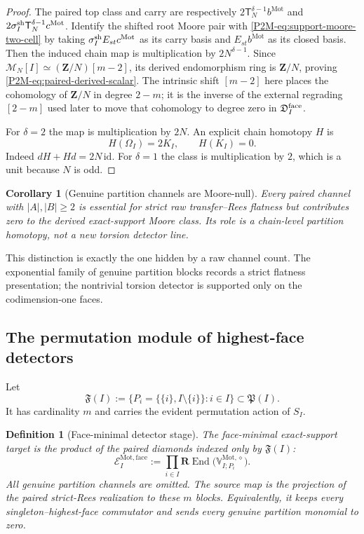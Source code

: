 \documentclass[11pt]{article}
\newtheorem{corollary}[theorem]{Corollary}
\newtheorem{definition}[theorem]{Definition}
\theoremstyle{remark}
\newcommand{\Z}{\mathbf Z}
\newcommand{\REnd}{\mathbf R\!\operatorname{End}}
\newcommand{\Mot}{\mathrm{Mot}}
\begin{document}
\begin{proof}
The paired top class and carry are respectively
$2\mathsf T_N^{\delta-1}b^{\Mot}$ and
$2\sigma_I^{\rm sh}\mathsf T_N^{\delta-1}c^{\Mot}$.  Identify the shifted
root Moore pair with \eqref{P2M-eq:support-moore-two-cell} by taking
$\sigma_I^{\rm sh}E_{st}c^{\Mot}$ as its carry basis and
$E_{st}b^{\Mot}$ as its closed basis.  Then the induced chain map
is multiplication by $2N^{\delta-1}$.  Since
$\mathcal M_N[I]\simeq(\Z/N)[m-2]$, its derived endomorphism ring is
$\Z/N$, proving \eqref{P2M-eq:paired-derived-scalar}.  The intrinsic shift
$[m-2]$ here places the cohomology of $\Z/N$ in degree $2-m$; it is the
inverse of the external regrading $[2-m]$ used later to move that cohomology
to degree zero in $\mathfrak D_I^{\rm face}$.

For $\delta=2$ the map is multiplication by $2N$.  An explicit chain homotopy
$H$ is
\[
 H(\Omega_I)=2K_I,
 \qquad
 H(K_I)=0.
\]
Indeed $dH+Hd=2N\,\mathrm{id}$.  For $\delta=1$ the class is multiplication
by $2$, which is a unit because $N$ is odd.
\end{proof}

\begin{corollary}[Genuine partition channels are Moore-null]
\label{P2M-cor:genuine-partition-moore-null}
Every paired channel with $|A|,|B|\ge2$ is essential for strict raw
transfer--Rees flatness but contributes zero to the derived exact-support
Moore class.  Its role is a chain-level partition homotopy, not a new torsion
detector line.
\end{corollary}

This distinction is exactly the one hidden by a raw channel count.  The
exponential family of genuine partition blocks records a strict flatness
presentation; the nontrivial torsion detector is supported only on the
codimension-one faces.

\subsection{The permutation module of highest-face detectors}

Let
\[
 \mathfrak F(I)
 :=\{P_i=\{\{i\},I\setminus\{i\}\}:i\in I\}
 \subset\mathfrak P(I).
\]
It has cardinality $m$ and carries the evident permutation action of $S_I$.

\begin{definition}[Face-minimal detector stage]
\label{P2M-def:face-minimal-detector-stage}
The face-minimal exact-support target is the product of the paired diamonds
indexed only by $\mathfrak F(I)$:
\[
 \boxed{
 \mathscr E_I^{\Mot,\mathrm{face}}
 :=\prod_{i\in I}
   \REnd\bigl(\mathbb V_{I;P_i}^{\Mot,\diamond}\bigr).}
\]
All genuine partition channels are omitted.  The source map is the projection
of the paired strict-Rees realization to these $m$ blocks.  Equivalently, it
keeps every singleton--highest-face commutator and sends every genuine
partition monomial to zero.
\end{definition}
\end{document}
